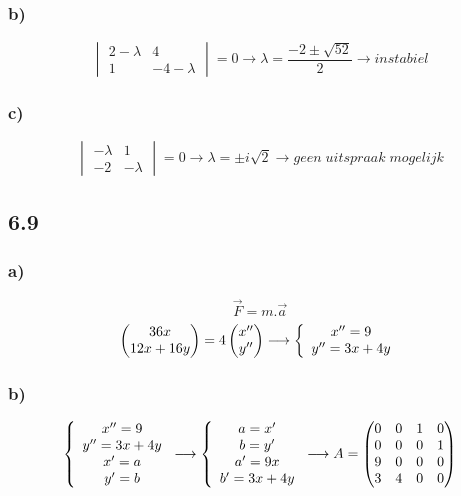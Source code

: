 \documentclass[11pt]{article}
\begin{document}
\subsubsection*{b)}
\[
\begin{vmatrix}
2-\lambda & 4\\
1 & -4-\lambda
\end{vmatrix}
=0
\longrightarrow
\lambda = \frac{-2 \pm \sqrt{52}}{2}
\longrightarrow
instabiel
\]

\subsubsection*{c)}
\[
\begin{vmatrix}
-\lambda & 1\\
-2 & -\lambda
\end{vmatrix}
=0
\longrightarrow
\lambda = \pm i\sqrt{2}
\longrightarrow
geen\;uitspraak\;mogelijk
\]

\subsection*{6.9}
\subsubsection*{a)}
\[
\vec{F}=m.\vec{a}
\]
\[
\begin{pmatrix}
36x\\12x+16y
\end{pmatrix}
=
4
\begin{pmatrix}
x''\\y''
\end{pmatrix}
\longrightarrow
\left\lbrace
\begin{array}{c c}
x''=9\\y''=3x+4y
\end{array}
\right.
\]

\subsubsection*{b)}
\[
\left\lbrace
\begin{array}{c c}
x''=9\\
y''=3x+4y\\
x' = a\\
y' = b
\end{array}
\right.
\longrightarrow
\left\lbrace
\begin{array}{c c}
a=x'\\
b=y'\\
a' = 9x\\
b' = 3x+4y
\end{array}
\right.
\longrightarrow
A=
\begin{pmatrix}
0 & 0 & 1 & 0\\
0 & 0 & 0 & 1\\
9 & 0 & 0 & 0\\
3 & 4 & 0 & 0\\
\end{pmatrix}
\]
\end{document}
